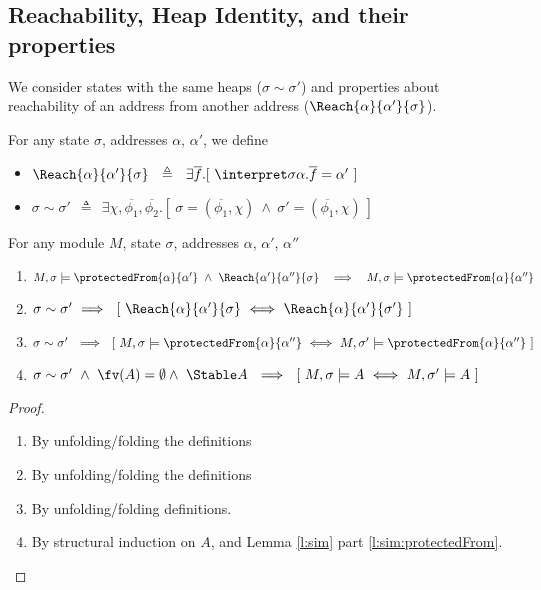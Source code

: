 \subsection{Reachability, Heap Identity, and their properties}
We consider states with the same heaps ($\sigma \sim \sigma'$) and properties about  reachability of an address from another address ($\Reach {\alpha} {\alpha'} {\sigma}$). 

\begin{definition}
For any state  $\sigma$,  addresses $\alpha$, $\alpha'$, we define

\begin{itemize}
\item
$\Reach {\alpha} {\alpha'} {\sigma} \ \ \triangleq\ \ \exists \overline f. [\ \interpret \sigma {\alpha.\overline f} = \alpha' \ ]$
\item
$\sigma \sim \sigma' \ \ \triangleq\ \ \exists \chi, \overline {\phi_1}, \overline {\phi_2}.[\ \sigma=( \overline {\phi_1}, \chi) \ \wedge \ \sigma'=( \overline {\phi_1}, \chi) \ ]$
\end{itemize}
\end{definition}

\begin{lemma}
\label{l:sim}
For any module $M$, state  $\sigma$,  addresses $\alpha$, $\alpha'$, $\alpha''$

\begin{enumerate}
\item
\label{l:reaches:protected}
$M, \sigma \models {\protectedFrom {\alpha} {\alpha'} } \ \wedge\   \Reach {\alpha'} {\alpha''} {\sigma}\ \   \ \Longrightarrow\ \ \ M, \sigma \models {\protectedFrom {\alpha} {\alpha''}  }$ 

\item
\label{l:sim:reaches}
$\sigma \sim \sigma'  \ \Longrightarrow \ \ [\ \Reach {\alpha} {\alpha'} {\sigma}  \ \Longleftrightarrow \ \Reach {\alpha} {\alpha'} {\sigma'}\ ] $ 


\item
\label{l:sim:protectedFrom}
$\sigma \sim \sigma'   \ \  \Longrightarrow\ \  [\  M, \sigma \models {\protectedFrom {\alpha} {\alpha''}}  \ \Longleftrightarrow \  M, \sigma' \models {\protectedFrom {\alpha} {\alpha''}} \  ]   $ 
 \item
 \label{l:sim:valid}
$\sigma \sim \sigma'  \   \wedge \ \fv(A)=\emptyset \wedge \ \Stable A \   \  \Longrightarrow\ \  [\  M, \sigma \models A  \ \Longleftrightarrow \  M, \sigma' \models A \  ]   $ 

 \end{enumerate}
\end{lemma}

\begin{proof} $ ~ $

\begin{enumerate}
\item
By  unfolding/folding the definitions
\item
By  unfolding/folding the definitions
\item
By unfolding/folding definitions.
\item
By structural induction on $A$, and Lemma \ref{l:sim} part \ref{l:sim:protectedFrom}.
\end{enumerate}

\end{proof}

